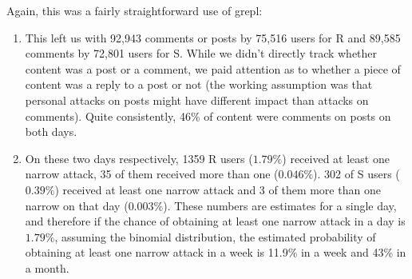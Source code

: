 \documentclass[10pt,]{scrartcl}
\newenvironment{Shaded}{\begin{snugshade}}{\end{snugshade}}
\newcommand{\KeywordTok}[1]{\textcolor[rgb]{0.13,0.29,0.53}{\textbf{#1}}}
\newcommand{\DataTypeTok}[1]{\textcolor[rgb]{0.13,0.29,0.53}{#1}}
\newcommand{\StringTok}[1]{\textcolor[rgb]{0.31,0.60,0.02}{#1}}
\newcommand{\OtherTok}[1]{\textcolor[rgb]{0.56,0.35,0.01}{#1}}
\newcommand{\OperatorTok}[1]{\textcolor[rgb]{0.81,0.36,0.00}{\textbf{#1}}}
\newcommand{\NormalTok}[1]{#1}
\begin{document}
Again, this was a fairly straightforward use of grepl:

\scriptsize

\begin{Shaded}
\end{Shaded}

\normalsize

\begin{enumerate}
\def\labelenumi{\arabic{enumi}.}
\setcounter{enumi}{4}
\item
  This left us with 92,943 comments or posts by 75,516 users for
  \textsf{R} and 89,585 comments by 72,801 users for \textsf{S}. While
  we didn't directly track whether content was a post or a comment, we
  paid attention as to whether a piece of content was a reply to a post
  or not (the working assumption was that personal attacks on posts
  might have different impact than attacks on comments). Quite
  consistently, 46\% of content were comments on posts on both days.
\item
  On these two days respectively, 1359 \textsf{R} users (\(1.79\%\))
  received at least one \textsf{narrow} attack, 35 of them received more
  than one (\(0.046\%\)). 302 of \textsf{S} users (\(0.39\%\)) received
  at least one \textsf{narrow} attack and 3 of them more than one
  \textsf{narrow} on that day (\(0.003\%\)). These numbers are estimates
  for a single day, and therefore if the chance of obtaining at least
  one \textsf{narrow} attack in a day is \(1.79\%\), assuming the
  binomial distribution, the estimated probability of obtaining at least
  one \textsf{narrow} attack in a week is 11.9\% in a week and 43\% in a
  month.
\end{enumerate}
\end{document}
